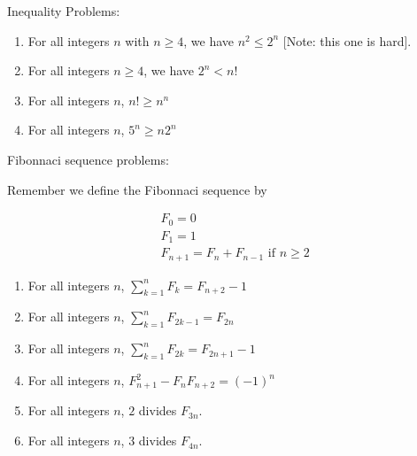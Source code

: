 \begin{xca}
Inequality Problems:

\begin{enumerate}
	\item For all integers $n$ with $n \geq 4$,  we have $n^2 \leq 2^n$ [Note:  this one is hard].
	\item For all integers $n  \geq 4$, we have $2^n < n!$
	\item For all integers $n$, $n! \geq n^n$
	\item For all integers $n$, $5^n \geq n2^n$
\end{enumerate}
\end{xca}

\begin{xca}
Fibonnaci sequence problems:

Remember we define the Fibonnaci sequence by

\begin{align*}
	&F_0 = 0\\
	&F_1 = 1\\
	&F_{n+1} = F_{n}+F_{n-1} \textrm{ if $n \geq 2$}
\end{align*}

\begin{enumerate}
	\item For all integers $n$, $\displaystyle \sum_{k=1}^n F_k = F_{n+2} - 1$
	\item For all integers $n$, $\displaystyle \sum_{k=1}^n F_{2k-1} = F_{2n}$
	\item For all integers $n$, $\displaystyle \sum_{k=1}^n F_{2k} = F_{2n+1} - 1$
	\item For all integers $n$, $F_{n+1}^2-F_{n}F_{n+2} = (-1)^n$
	\item For all integers $n$, $2$ divides $F_{3n}$.
	\item For all integers $n$, $3$ divides $F_{4n}$.
\end{enumerate}
\end{xca}

